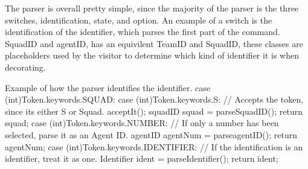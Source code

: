 The parser is overall pretty simple, since the majority of the parser is the three switches, identification, state, and option. An example of a switch is the identification of the identifier, which parses the first part of the command.\\
SquadID and agentID, has an equivilent TeamID and SquadID, these classes are placeholders used by the visitor to determine which kind of identifier it is when decorating.

\begin{source}{Example of how the parser identifies the identifier.}{}
case (int)Token.keywords.SQUAD:
case (int)Token.keywords.S:
	// Accepts the token, since its either S or Squad.
   	acceptIt();
    squadID squad = parseSquadID();
    return squad;
case (int)Token.keywords.NUMBER:
	// If only a number has been selected, parse it as an Agent ID.
	agentID agentNum = parseagentID();
    return agentNum;
case (int)Token.keywords.IDENTIFIER:
    // If the identification is an identifier, treat it as one.
    Identifier ident = parseIdentifier();
	return ident;
\end{source}